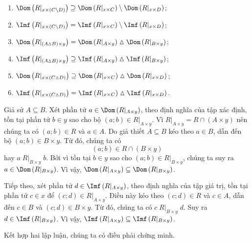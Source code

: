 \begin{enumerate}
   \item $\Dom\left(R|_{x \times (C \setminus D)}\right) \supseteq \Dom\left(R|_{x \times C}\right) \setminus \Dom\left(R|_{x \times D}\right)$;
   \item $\Imf\left(R|_{x \times (C \setminus D)}\right) = \Imf\left(R|_{x \times C}\right) \setminus \Imf\left(R|_{x \times D}\right)$;
   \item $\Dom\left(R|_{(A\vartriangle B) \times y}\right) = \Dom\left(R|_{A \times y}\right) \vartriangle \Dom\left(R|_{B \times y}\right)$;
   \item $\Imf\left(R|_{(A\vartriangle B) \times y}\right) \supseteq \Imf\left(R|_{A \times y}\right) \vartriangle \Imf\left(R|_{B \times y}\right)$;
   \item $\Dom\left(R|_{x \times (C \vartriangle D)}\right) \supseteq \Dom\left(R|_{x \times C}\right) \vartriangle \Dom\left(R|_{x \times D}\right)$;
   \item $\Imf\left(R|_{x \times (C \vartriangle D)}\right) = \Imf\left(R|_{x \times C}\right) \vartriangle \Imf\left(R|_{x \times D}\right)$.
\end{enumerate}
   
\solution

\resetSubexercise Giả sử $A \subseteq B$. Xét phần tử $a \in \Dom\left(R|_{A \times y}\right)$, theo định nghĩa của tập xác định, tồn tại phần tử $b \in y$ sao cho bộ $(a; b) \in R|_{A \times y}$. Vì $R|_{A \times y} = R \cap (A \times y)$ nên chúng ta có $(a; b) \in R$ và $a \in A$. Do giả thiết $A \subseteq B$ kéo theo $a \in B$, dẫn đến bộ $(a; b) \in B \times y$. Từ đó, chúng ta có
\begin{equation*}
   (a; b) \in R \cap (B \times y)
\end{equation*}
hay $a\;R|_{B \times y}\;b$. Bởi vì tồn tại $b \in y$ sao cho $(a; b) \in R|_{B \times y}$, chúng ta suy ra $a \in \Dom\left(R|_{B \times y}\right)$. Vì vậy, $\Dom\left(R|_{A \times y}\right) \subseteq \Dom\left(R|_{B \times y}\right)$.

Tiếp theo, xét phần tử $d \in \Imf\left(R|_{A \times y}\right)$, theo định nghĩa của tập giá trị, tồn tại phần tử $c \in x$ để $(c; d) \in R|_{A \times y}$. Điều này kéo theo $(c; d) \in R$ và $c \in A$, dẫn đến $c \in B$ và $(c; d) \in B \times y$. Từ đó, chúng ta có $c\;R|_{B \times y}\;d$. Suy ra $d \in \Imf\left(R|_{B \times y}\right)$. Vì vậy, $\Imf\left(R|_{A \times y}\right) \subseteq \Imf\left(R|_{B \times y}\right)$.

Kết hợp hai lập luận, chúng ta có điều phải chứng minh.

